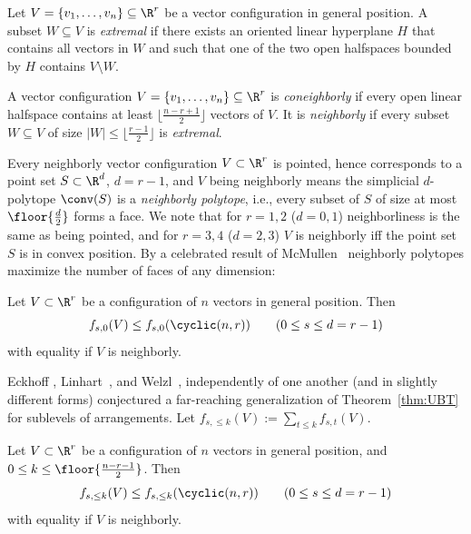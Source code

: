 %
Let $V=\{v_1,\dots,v_n\} \subseteq \R^r$ be a vector configuration in general position. A subset $W\subseteq V$ is \emph{extremal} if there exists an oriented linear hyperplane $H$ that contains all vectors in $W$ and such that one of the two open halfspaces bounded by $H$ contains $V\setminus W$.
%
\begin{definition} A vector configuration 
$V=\{v_1,\dots,v_n\} \subseteq \R^r$ is \emph{coneighborly} if every open linear halfspace contains at least $\lfloor \frac{n-r+1}{2} \rfloor$ vectors of $V$. 
It is \emph{neighborly} if every subset $W \subseteq V$ of size $|W| \leq \lfloor \frac{r-1}{2} \rfloor$ is \emph{extremal}.
\end{definition}
Every neighborly vector configuration $V \subset \R^r$ is pointed, hence corresponds to a point set $S\subset \R^d$, $d=r-1$, and $V$ being neighborly means the simplicial $d$-polytope $\conv(S)$ is a \emph{neighborly polytope}, i.e., every subset of $S$ of size at most $\floor{\frac{d}{2}}$ forms a face. 
We note that for $r=1,2$ ($d=0,1$) neighborliness is the same as being pointed, and for $r=3,4$ ($d=2,3$) $V$ is neighborly iff the point set $S$ is in convex position. By a celebrated result of McMullen~\cite{McMullen:1970aa} neighborly polytopes maximize the number of faces of any dimension:
%
\begin{theorem} 
\label{thm:UBT}
Let $V \subset \R^r$ be a configuration of $n$ vectors in general position. Then
\[
f_{s,0}(V) \leq f_{s,0}(\cyclic(n,r)) \qquad (0 \leq s \leq d=r-1)
\]
with equality if $V$ is neighborly.
\end{theorem}
Eckhoff \cite[Conj.~9.8]{Eckhoff:1993aa}, Linhart~\cite{Linhart:1994aa}, and Welzl~\cite{Welzl:2001aa}, independently of one another (and in slightly different forms) conjectured a far-reaching generalization of Theorem~\ref{thm:UBT} for sublevels of arrangements. Let $f_{s,\leq k}(V):=\sum_{t\leq k}f_{s,t}(V)$.
%
\begin{conjecture}
\label{GUBC} 
Let $V \subset \R^r$ be a configuration of $n$ vectors in general position, and $0\leq k\leq \floor{\frac{n-r-1}{2}}$. Then 
\[f_{s,\leq k}(V) \leq f_{s,\leq k}(\cyclic(n,r)) \qquad (0 \leq s \leq d=r-1)\]
with equality if $V$ is neighborly.
\end{conjecture}
